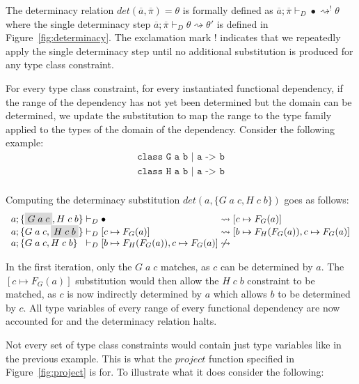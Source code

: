 The determinacy relation $det(\overline{a},\overline{\pi}) = \theta$ is formally
defined as $\overline{a};\overline{\pi} \vdash_{D} \bullet \rightsquigarrow^!
\theta$ where the single determinacy step $\overline{a};\overline{\pi}
\vdash_{D} \theta \rightsquigarrow \theta'$ is defined in
Figure~\ref{fig:determinacy}. The exclamation mark $!$ indicates that we
repeatedly apply the single determinacy step until no additional substitution is
produced for any type class constraint.

For every type class constraint, for every instantiated functional dependency,
if the range of the dependency has not yet been determined but the domain can be
determined, we update the substitution to map the range to the type family
applied to the types of the domain of the dependency. Consider the following
example:
\[
\begin{array}{l}
\texttt{class G a b | a -> b}\\
\texttt{class H a b | a -> b}\\
\end{array}
\]

Computing the determinacy substitution $det(a, \{G \; a \; c, H \; c \; b \} )$
goes as follows:
\[
\begin{array}{l@{\hspace{1mm}}l@{\hspace{1mm}}c@{\hspace{1mm}}l}
a; \{\highlight{G \; a \; c}, H \; c \; b\} &\vdash_{D} \bullet
&\rightsquigarrow& [c \mapsto F_G(a)]
\\
a; \{G \; a \; c, \highlight{H \; c \; b}\} &\vdash_{D}  [c \mapsto F_G(a)]
&\rightsquigarrow& [b \mapsto F_H(F_G(a)), c \mapsto F_G(a)]
\\
a; \{G \; a \; c, H \; c \; b\} &\vdash_{D}  [b \mapsto F_H(F_G(a)), c \mapsto
F_G(a)] &\not\rightsquigarrow&
\end{array}
\]

In the first iteration, only the $G \; a \; c$ matches, as $c$ can be determined
by $a$. The $[c \mapsto F_G(a)]$ substitution would then allow the $H \; c \; b$
constraint to be matched, as $c$ is now indirectly determined by $a$ which
allows $b$ to be determined by $c$. All type variables of every range of every
functional dependency are now accounted for and the determinacy relation halts.

Not every set of type class constraints would contain just type variables like
in the previous example. This is what the $project$ function specified in
Figure~\ref{fig:project} is for. To illustrate what it does consider the
following:

